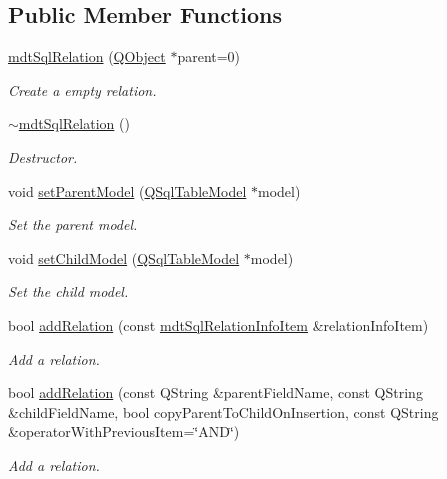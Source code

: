 \subsection*{Public Member Functions}
\begin{DoxyCompactItemize}
\item 
\hyperlink{classmdt_sql_relation_a65d9602a4663c8c356938ba9a217704f}{mdt\-Sql\-Relation} (\hyperlink{class_q_object}{Q\-Object} $\ast$parent=0)
\begin{DoxyCompactList}\small\item\em Create a empty relation. \end{DoxyCompactList}\item 
\hyperlink{classmdt_sql_relation_a22c7de1daa71abbde33199a08541310b}{$\sim$mdt\-Sql\-Relation} ()
\begin{DoxyCompactList}\small\item\em Destructor. \end{DoxyCompactList}\item 
void \hyperlink{classmdt_sql_relation_a5ac3a82c5d3e33b5e40b86acfe7e2a03}{set\-Parent\-Model} (\hyperlink{class_q_sql_table_model}{Q\-Sql\-Table\-Model} $\ast$model)
\begin{DoxyCompactList}\small\item\em Set the parent model. \end{DoxyCompactList}\item 
void \hyperlink{classmdt_sql_relation_ad74021dcf86c528044bf67220ed36833}{set\-Child\-Model} (\hyperlink{class_q_sql_table_model}{Q\-Sql\-Table\-Model} $\ast$model)
\begin{DoxyCompactList}\small\item\em Set the child model. \end{DoxyCompactList}\item 
bool \hyperlink{classmdt_sql_relation_a53c649cbf59fef6ea61dd9f2ab40d770}{add\-Relation} (const \hyperlink{structmdt_sql_relation_info_item}{mdt\-Sql\-Relation\-Info\-Item} \&relation\-Info\-Item)
\begin{DoxyCompactList}\small\item\em Add a relation. \end{DoxyCompactList}\item 
bool \hyperlink{classmdt_sql_relation_a5980d1df4582971666ffe1c1d7639799}{add\-Relation} (const Q\-String \&parent\-Field\-Name, const Q\-String \&child\-Field\-Name, bool copy\-Parent\-To\-Child\-On\-Insertion, const Q\-String \&operator\-With\-Previous\-Item=\char`\"{}A\-N\-D\char`\"{})
\begin{DoxyCompactList}\small\item\em Add a relation. \end{DoxyCompactList}\item 

\end{DoxyCompactItemize}
